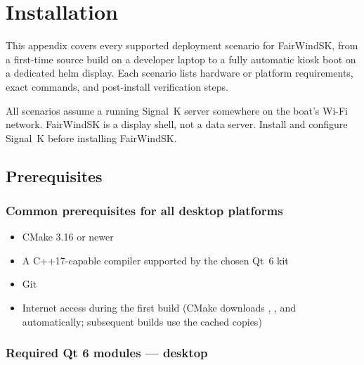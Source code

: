 \chapter{Installation}
\label{app:installation}

This appendix covers every supported deployment scenario for FairWindSK,
from a first-time source build on a developer laptop to a fully automatic
kiosk boot on a dedicated helm display.
Each scenario lists hardware or platform requirements, exact commands,
and post-install verification steps.

\begin{notebox}
All scenarios assume a running Signal~K server somewhere on the boat's
Wi-Fi network.
FairWindSK is a display shell, not a data server.
Install and configure Signal~K before installing FairWindSK.
\end{notebox}

\section{Prerequisites}
\label{app:prerequisites}

\subsection{Common prerequisites for all desktop platforms}

\begin{itemize}
  \item CMake 3.16 or newer
  \item A C++17-capable compiler supported by the chosen Qt~6 kit
  \item Git
  \item Internet access during the first build
        (CMake downloads , , and 
        automatically; subsequent builds use the cached copies)
\end{itemize}

\subsection{Required Qt 6 modules --- desktop}

